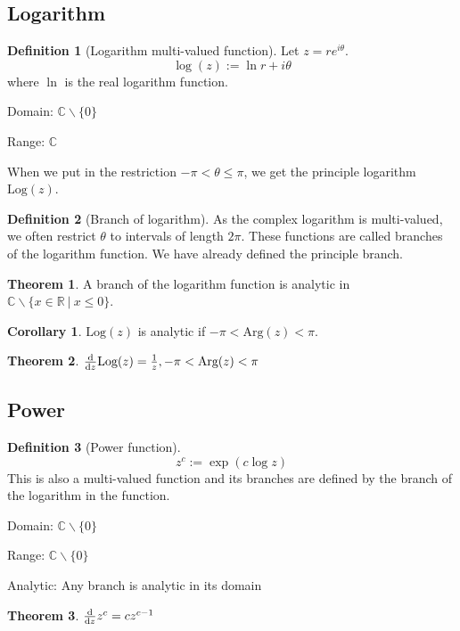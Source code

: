 \documentclass[10pt, a4paper]{extarticle}
\theoremstyle{definition}
\newtheorem{thm}{Theorem}
\newtheorem{cor}{Corollary}[thm]
\newtheorem{defn}{Definition}
\begin{document}
	\subsection{Logarithm}
	\begin{defn}[Logarithm multi-valued function]
		Let $z=re^{i\theta}$.
		\[\log(z):=\ln r+i\theta\]
		where $\ln$ is the real logarithm function.

		Domain: $\mathbb{C}\backslash\{0\}$

		Range: $\mathbb{C}$

		When we put in the restriction $-\pi<\theta\leq\pi$, we get the principle logarithm $\text{Log}(z)$.

	\end{defn}
	\begin{defn}[Branch of logarithm]
		As the complex logarithm is multi-valued, we often restrict $\theta$ to intervals of length $2\pi$. These functions are called branches of the logarithm function. We have already defined the principle branch.
	\end{defn}

	\begin{thm}
		A branch of the logarithm function is analytic in $\mathbb{C}\backslash\{x\in\mathbb{R}\ |\ x\leq 0\}$.
	\end{thm}
	\begin{cor}
		$\text{Log}(z)$ is analytic if $-\pi<\text{Arg}(z)<\pi$.
	\end{cor}

	\begin{thm}\label{logderivative}
		$\dv{}{z}\text{Log}(z)=\frac{1}{z},-\pi<\text{Arg}(z)<\pi$
	\end{thm}

	\subsection{Power}
	\begin{defn}[Power function]
		\[z^c:=\exp(c\log z)\]
		This is also a multi-valued function and its branches are defined by the branch of the logarithm in the function.

		Domain: $\mathbb{C}\backslash\{0\}$

		Range: $\mathbb{C}\backslash\{0\}$

		Analytic: Any branch is analytic in its domain
	\end{defn}
	\begin{thm}
		$\dv{}{z}z^c=cz^{c-1}$
	\end{thm}
\end{document}
